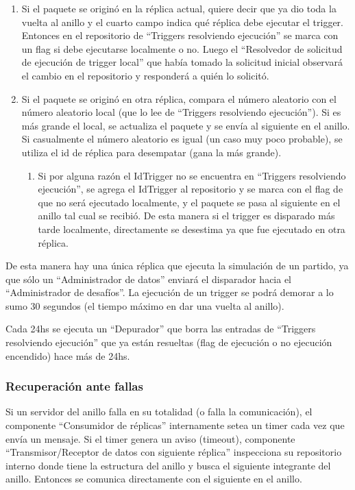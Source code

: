 \begin{enumerate}
	\item Si el paquete se originó en la réplica actual, quiere decir que ya dio toda la vuelta al anillo y el cuarto campo indica qué réplica debe ejecutar el trigger. Entonces en el repositorio de “Triggers resolviendo ejecución” se marca con un flag si debe ejecutarse localmente o no. Luego el “Resolvedor de solicitud de ejecución de trigger local” que había tomado la solicitud inicial observará el cambio en el repositorio y responderá a quién lo solicitó.

	\item Si el paquete se originó en otra réplica, compara el número aleatorio con el número aleatorio local (que lo lee de “Triggers resolviendo ejecución”). Si es más grande el local, se actualiza el paquete y se envía al siguiente en el anillo. Si casualmente el número aleatorio es igual (un caso muy poco probable), se utiliza el id de réplica para desempatar (gana la más grande).

\begin{enumerate}
		\item Si por alguna razón el IdTrigger no se encuentra en “Triggers resolviendo ejecución”, se agrega el IdTrigger al repositorio y se marca con el flag de que no será ejecutado localmente, y el paquete se pasa al siguiente en el anillo tal cual se recibió. De esta manera si el trigger es disparado más tarde localmente, directamente se desestima ya que fue ejecutado en otra réplica.
\end{enumerate}
\end{enumerate}


De esta manera hay una única réplica que ejecuta la simulación de un partido, ya que sólo un “Administrador de datos” enviará el disparador hacia el “Administrador de desafíos”. La ejecución de un trigger se podrá demorar a lo sumo 30 segundos (el tiempo máximo en dar una vuelta al anillo).

Cada 24hs se ejecuta un “Depurador” que borra las entradas de “Triggers resolviendo ejecución” que ya están resueltas (flag de ejecución o no ejecución encendido) hace más de 24hs.


\subsubsection{Recuperación ante fallas}

Si un servidor del anillo falla en su totalidad (o falla la comunicación), el componente “Consumidor de réplicas” internamente setea un timer cada vez que envía un mensaje. Si el timer genera un aviso (timeout), componente “Transmisor/Receptor de datos con siguiente réplica” inspecciona su repositorio interno donde tiene la estructura del anillo y busca el siguiente integrante del anillo. Entonces se comunica directamente con el siguiente en el anillo.


